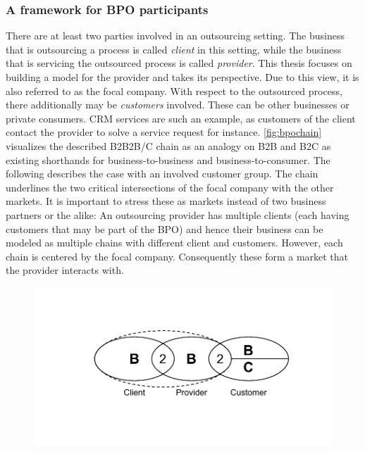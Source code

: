 		\subsubsection{A framework for BPO participants}
	There are at least two parties involved in an outsourcing setting. The business that is outsourcing a process is called \textit{client} in this setting, while the business that is servicing the outsourced process is called \textit{provider}. This thesis focuses on building a model for the provider and takes its perspective. Due to this view, it is also referred to as the focal company. With respect to the outsourced process, there additionally may be \textit{customers} involved. These can be other businesses or private consumers. CRM services are such an example, as customers of the client contact the provider to solve a service request for instance. \ref{fig:bpochain} visualizes the described B2B2B/C chain as an analogy on B2B and B2C as existing shorthands for business-to-business and business-to-consumer. The following describes the case with an involved customer group. The chain underlines the two critical intersections of the focal company with the other markets. It is important to stress these as markets instead of two business partners or the alike: An outsourcing provider has multiple clients (each having customers that may be part of the BPO) and hence their business can be modeled as multiple chains with different client and customers. However, each chain is centered by the focal company. Consequently these form a market that the provider interacts with.
	
			\begin{figure}[caption={BPO B2B2B/C Chain}, label={fig:bpochain}]
		{	\includegraphics[width=.8\textwidth]{figures/bpochain.pdf}}
	\end{figure}

